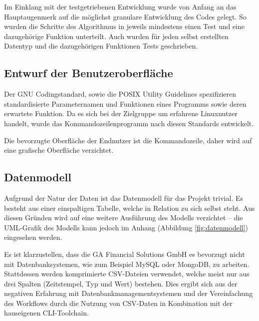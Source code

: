 Im Einklang mit der testgetriebenen Entwicklung wurde von Anfang an das Hauptaugenmerk
auf die möglichst granulare Entwicklung des Codes gelegt. So wurden die Schritte
des Algorithmus in jeweils mindestens einen Test und eine dazugehörige Funktion unterteilt.
Auch wurden für jeden selbst erstellten Datentyp und die dazugehörigen Funktionen Tests geschrieben.




\subsection{Entwurf der Benutzeroberfläche}
Der GNU Codingstandard\cite{gnuCodingStandard},
sowie die POSIX Utility Guidelines\cite{posixGuidelines}
spezifizieren standardisierte Parameternamen und Funktionen eines Programms sowie
deren erwartete Funktion. Da es sich bei der Zielgruppe um erfahrene Linuxnutzer handelt, wurde das Kommandozeilenprogramm nach diesen Standards entwickelt.\par

Die bevorzugte Oberfläche der Endnutzer ist die Kommandozeile, daher wird auf eine grafische Oberfläche verzichtet.

\subsection{Datenmodell}
Aufgrund der Natur der Daten ist das Datenmodell für das Projekt trivial. Es besteht aus einer
einspaltigen Tabelle, welche in Relation zu sich selbst steht. Aus diesen Gründen wird auf eine weitere Ausführung des 
Modells verzichtet -- die UML-Grafik des Modells kann jedoch im Anhang (Abbildung \ref{fig:datenmodell}) eingesehen werden.

Es ist klarzustellen, dass die GA Financial Solutions GmbH es bevorzugt nicht mit Datenbanksystemen, wie
 zum Beispiel MySQL oder MongoDB, zu arbeiten. Stattdessen werden komprimierte CSV-Dateien verwendet, welche
meist nur aus drei Spalten (Zeitstempel, Typ und Wert) bestehen. Dies ergibt sich aus
der negativen Erfahrung mit Datenbankmanagementsystemen und der Vereinfachung des Workflows durch
die Nutzung von CSV-Daten in Kombination mit der hauseigenen CLI-Toolchain.


